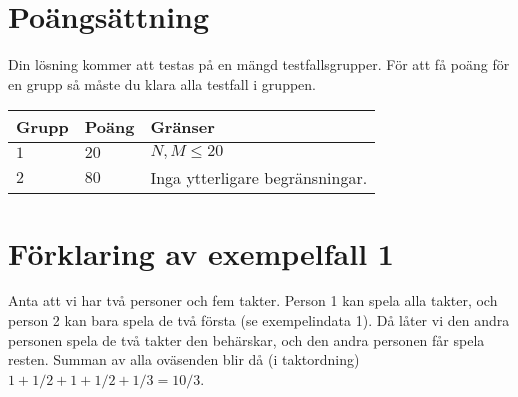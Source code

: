 \section*{Poängsättning}
Din lösning kommer att testas på en mängd testfallsgrupper.
För att få poäng för en grupp så måste du klara alla testfall i gruppen.

\noindent
\begin{tabular}{| l | l | p{12cm} |}
  \hline
  \textbf{Grupp} & \textbf{Poäng} & \textbf{Gränser} \\ \hline
  $1$    & $20$       & $N, M \leq 20$ \\ \hline
  $2$    & $80$       & Inga ytterligare begränsningar. \\ \hline
\end{tabular}



\section*{Förklaring av exempelfall 1}
Anta att vi har två personer och fem takter. Person 1 kan spela alla takter, och person 2 kan bara spela de två första (se exempelindata 1). Då låter vi den andra personen spela de två takter den behärskar, och den andra personen får spela resten. Summan av alla oväsenden blir då (i taktordning) $1 + 1/2 + 1 + 1/2 + 1/3 = 10/3$.
